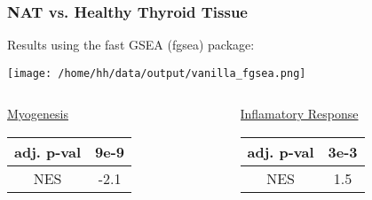 \documentclass[11pt]{beamer}
\begin{document}
\begin{frame}
  \frametitle{NAT vs. Healthy Thyroid Tissue}
  
  Results using the fast GSEA (fgsea) package:
    \begin{center}
    \texttt{[image: /home/hh/data/output/vanilla\_fgsea.png]}
  \end{center}
  \begin{columns}
    \begin{column}{0.5\textwidth}
      \begin{center}
        \underline{Myogenesis}
        
        \begin{tabular}{ |c|c| } 
        \hline
        adj. p-val & \textbf{9e-9} \\
        \hline
        NES & -2.1 \\
        \hline
        \end{tabular}
      \end{center}
    \end{column}
    \vrule{}
    \begin{column}{0.5\textwidth}  %
      \begin{center}
        \underline{Inflamatory Response}
        
        \begin{tabular}{ |c|c| } 
        \hline
        adj. p-val & \textbf{3e-3} \\
        \hline
        NES & 1.5 \\
        \hline
        \end{tabular}
      \end{center}
    \end{column}
  \end{columns}

  \pause


\end{frame}
\end{document}

